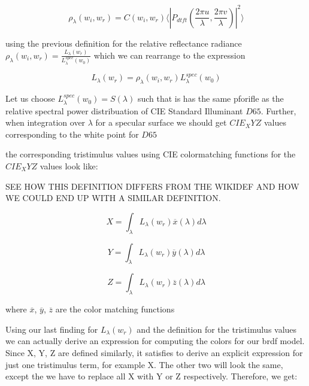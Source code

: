 \begin{equation}
\rho_\lambda(w_i,w_r) =  C(w_i,w_r) \langle \left|P_{dtft}(\frac{2\pi u}{\lambda}, \frac{2\pi v}{\lambda})\right|^2\rangle
\end{equation}

using the previous definition for the relative reflectance radiance $\rho_\lambda(w_i,w_r) = \frac{L_\lambda(w_r)}{L_\lambda^{spec}(w_0)}$ which we can rearrange to the expression 

\begin{equation}
L_\lambda(w_r) = \rho_\lambda(w_i,w_r)L_\lambda^{spec}(w_0)
\end{equation}

Let us choose $L_\lambda^{spec}(w_0) = S(\lambda)$ such that is has the same pforifle as the relative spectral power distribuation of CIE Standard Illuminant $D65$. Further, when integration over $\lambda$ for a specular surface we should get $CIE_XYZ$ values corresponding to the white point for $D65$ 

the corresponding tristimulus values using CIE colormatching functions for the $CIE_XYZ$ values look like:

SEE HOW THIS DEFINITION DIFFERS FROM THE WIKIDEF AND HOW WE COULD END UP WITH A SIMILAR DEFINITION.

\begin{equation}
X = \int_{\lambda}L_\lambda(w_r)\overline{x}(\lambda)d\lambda
\end{equation} 

\begin{equation}
Y = \int_{\lambda}L_\lambda(w_r)\overline{y}(\lambda)d\lambda
\end{equation}

\begin{equation}
Z = \int_{\lambda}L_\lambda(w_r)\overline{z}(\lambda)d\lambda
\end{equation}

where $\overline{x}$, $\overline{y}$, $\overline{z}$ are the color matching functions

Using our last finding for $L_\lambda(w_r)$ and the definition for the tristimulus values we can actually derive an expression for computing the colors for our brdf model. Since X, Y, Z are defined similarly, it satisfies to derive an explicit expression for just one tristimulus term, for example X. The other two will look the same, except the we have to replace all X with Y or Z respectively. Therefore, we get:

